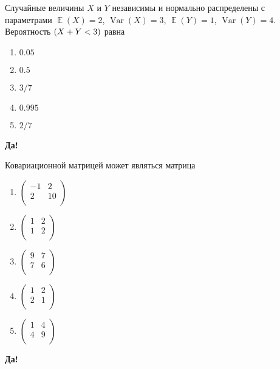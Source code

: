 \documentclass[t]{beamer}
\DeclareMathOperator{\Var}{Var}
\DeclareMathOperator{\E}{\mathbb{E}}
\let\P\relax
\DeclareMathOperator{\P}{\mathbb{P}}
\begin{document}
 \begin{frame} \label{4-Yes} 
\begin{block}{4} 

  Случайные величины $X$ и $Y$ независимы и нормально распределены с параметрами $\E(X)=2$, $\Var(X)=3$, $\E(Y)=1$, $\Var(Y)=4$. Вероятность $\P(X+Y<3)$ равна
  


 \end{block} 
\begin{enumerate} 
\item[] \hyperlink{4-No}{\beamergotobutton{} $0.05$}
\item[] \hyperlink{4-Yes}{\beamergotobutton{} $0.5$}
\item[] \hyperlink{4-No}{\beamergotobutton{} $3/7$}
\item[] \hyperlink{4-No}{\beamergotobutton{} $0.995$}
\item[] \hyperlink{4-No}{\beamergotobutton{} $2/7$}
\end{enumerate} 

 \textbf{Да!} 
 \hyperlink{5}{}\end{frame} 


 \begin{frame} \label{5-Yes} 
\begin{block}{5} 

  Ковариационной матрицей может являться матрица
  


 \end{block} 
\begin{enumerate} 
\item[] \hyperlink{5-No}{\beamergotobutton{} $\begin{pmatrix} -1 & 2 \\ 2 & 10 \\ \end{pmatrix}$}
\item[] \hyperlink{5-No}{\beamergotobutton{} $\begin{pmatrix} 1 & 2 \\ 1 & 2 \\ \end{pmatrix}$}
\item[] \hyperlink{5-Yes}{\beamergotobutton{} $\begin{pmatrix} 9 & 7 \\ 7 & 6 \\ \end{pmatrix}$}
\item[] \hyperlink{5-No}{\beamergotobutton{} $\begin{pmatrix} 1 & 2 \\ 2 & 1 \\ \end{pmatrix}$}
\item[] \hyperlink{5-No}{\beamergotobutton{} $\begin{pmatrix} 1 & 4 \\ 4 & 9 \\ \end{pmatrix}$}
\end{enumerate} 

 \textbf{Да!} 
 \hyperlink{6}{}\end{frame} 
\end{document}

